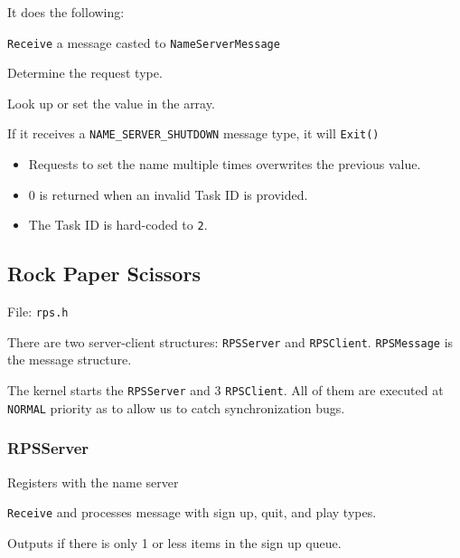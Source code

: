 \documentclass[letterpaper]{article}
\begin{document}
It does the following:
\begin{list}{.}
{
\setlength{\rightmargin}{\leftmargin}
}

\item \texttt{Receive} a message casted to \texttt{NameServerMessage}

\item Determine the request type.

\item Look up or set the value in the array.

\item If it receives a \texttt{NAME\_SERVER\_SHUTDOWN} message type, it will \texttt{Exit()}
\end{list}
%
\begin{itemize}

\item Requests to set the name multiple times overwrites the previous value.

\item 0 is returned when an invalid Task ID is provided.

\item The Task ID is hard-coded to \texttt{2}.

\end{itemize}


\subsection{Rock Paper Scissors%
  \label{rock-paper-scissors}%
}

File: \texttt{rps.h}

There are two server-client structures: \texttt{RPSServer} and \texttt{RPSClient}. \texttt{RPSMessage} is the message structure.

The kernel starts the \texttt{RPSServer} and 3 \texttt{RPSClient}. All of them are executed at \texttt{NORMAL} priority as to allow us to catch synchronization bugs.


\subsubsection{RPSServer%
  \label{rpsserver}%
}
\setcounter{listcnt0}{0}
\begin{list}{.}
{
\setlength{\rightmargin}{\leftmargin}
}

\item Registers with the name server

\item \texttt{Receive} and processes message with sign up, quit, and play types.

\item Outputs if there is only 1 or less items in the sign up queue.
\end{list}
\end{document}
